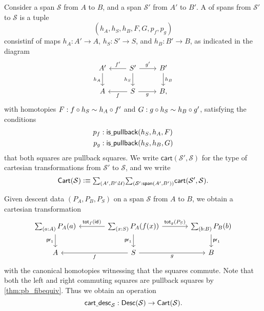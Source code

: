 \begin{defn}
Consider a span $\mathcal{S}$ from $A$ to $B$, and a span $\mathcal{S}'$ from $A'$ to $B'$. A  of spans from $\mathcal{S}'$ to $\mathcal{S}$ is a tuple
\begin{equation*}
(h_A,h_S,h_B,F,G,p_f,p_g)
\end{equation*}
consistinf of maps $h_A:A'\to A$, $h_S:S'\to S$, and $h_B:B'\to B$, as indicated in the diagram
\begin{equation*}
\begin{tikzcd}
A' \arrow[d,swap,"h_A"]  & S' \arrow[l,swap,"{f'}"] \arrow[r,"{g'}"] \arrow[d,swap,"h_S"] & B' \arrow[d,"h_B"] \\
A & S \arrow[l,"f"] \arrow[r,swap,"g"] & B,
\end{tikzcd}
\end{equation*}
with homotopies $F:f\circ h_S\sim h_A\circ f'$ and $G:g\circ h_S\sim h_B\circ g'$, satisfying the conditions
\begin{align*}
p_f & : \mathsf{is\underline{\ }{}pullback}(h_S,h_A,F) \\
p_g & : \mathsf{is\underline{\ }{}pullback}(h_S,h_B,G)
\end{align*}
that both squares are pullback squares. We write $\mathsf{cart}(\mathcal{S}',\mathcal{S})$ for the type of cartesian transformations from $\mathcal{S}'$ to $\mathcal{S}$, and we write
\begin{equation*}
\mathsf{Cart}(\mathcal{S}) \defeq \sm{A',B':\UU}{\mathcal{S}':\mathsf{span}(A',B')}\mathsf{cart}(\mathcal{S}',\mathcal{S}).
\end{equation*}
\end{defn}

Given descent data $(P_A,P_B,P_S)$ on a span $\mathcal{S}$ from $A$ to $B$, we obtain a cartesian transformation
\begin{equation*}
\begin{tikzcd}[column sep=large]
\sm{a:A}P_A(a) \arrow[d,swap,"\proj 1"] & \sm{x:S}P_A(f(x)) \arrow[d,swap,"\proj 1"] \arrow[l,swap,"{\total[f]{\idfunc}}"] \arrow[r,"{\total[g]{P_S}}"] & \sm{b:B}P_B(b) \arrow[d,"\proj 1"] \\
A & S \arrow[l,"f"] \arrow[r,swap,"g"] & B
\end{tikzcd}
\end{equation*}
with the canonical homotopies witnessing that the squares commute. Note that both the left and right commuting squares are pullback squares by \cref{thm:pb_fibequiv}. Thus we obtain an operation
\begin{equation*}
\mathsf{cart\underline{\ }{}desc}_{\mathcal{S}}:\mathsf{Desc}(\mathcal{S})\to \mathsf{Cart}(\mathcal{S}).
\end{equation*}

